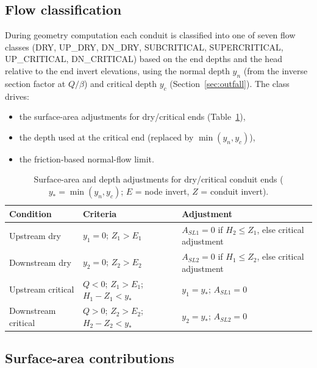 \documentclass[11pt,a4paper]{article}
\begin{document}
\subsection{Flow classification}

During geometry computation each conduit is classified into one of seven flow
classes (DRY, UP\_DRY, DN\_DRY, SUBCRITICAL, SUPERCRITICAL, UP\_CRITICAL,
DN\_CRITICAL) based on the end depths and the head relative to the end invert
elevations, using the normal depth $y_n$ (from the inverse section factor at
$Q/\beta$) and critical depth $y_c$ (Section~\ref{sec:outfall}). The class
drives:
\begin{itemize}[nosep]
  \item the surface-area adjustments for dry/critical ends (Table~\ref{tab:surfadj}),
  \item the depth used at the critical end (replaced by $\min(y_n, y_c)$),
  \item the friction-based normal-flow limit.
\end{itemize}

\begin{table}[H]
\centering
\small
\begin{tabular}{lll}
\toprule
\textbf{Condition} & \textbf{Criteria} & \textbf{Adjustment} \\
\midrule
Upstream dry & $y_1 = 0$; $Z_1 > E_1$ & $A_{SL1} = 0$ if $H_2 \le Z_1$, else critical adjustment \\
Downstream dry & $y_2 = 0$; $Z_2 > E_2$ & $A_{SL2} = 0$ if $H_1 \le Z_2$, else critical adjustment \\
Upstream critical & $Q < 0$; $Z_1 > E_1$; $H_1 - Z_1 < y_*$ & $y_1 = y_*$; $A_{SL1} = 0$ \\
Downstream critical & $Q > 0$; $Z_2 > E_2$; $H_2 - Z_2 < y_*$ & $y_2 = y_*$; $A_{SL2} = 0$ \\
\bottomrule
\end{tabular}
\caption{Surface-area and depth adjustments for dry/critical conduit ends
($y_* = \min(y_n, y_c)$; $E$ = node invert, $Z$ = conduit invert).}
\label{tab:surfadj}
\end{table}

\subsection{Surface-area contributions}
\end{document}
